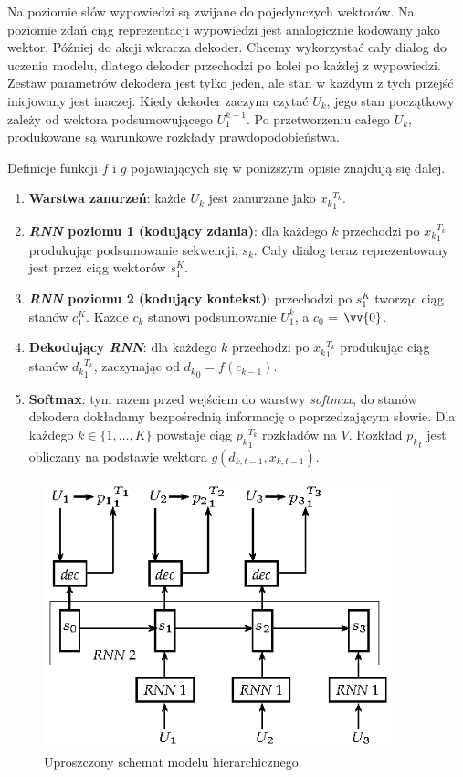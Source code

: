 Na poziomie słów wypowiedzi są zwijane do pojedynczych wektorów. Na poziomie zdań ciąg reprezentacji wypowiedzi jest analogicznie kodowany jako wektor. Później do akcji wkracza dekoder. Chcemy wykorzystać cały dialog do uczenia modelu, dlatego dekoder przechodzi po kolei po każdej z wypowiedzi. Zestaw parametrów dekodera jest tylko jeden, ale stan w każdym z tych przejść inicjowany jest inaczej. Kiedy dekoder zaczyna czytać $U_k$, jego stan początkowy zależy od wektora podsumowującego $U_1^{k-1}$. Po przetworzeniu całego $U_k$, produkowane są warunkowe rozkłady prawdopodobieństwa.

\noindent
Definicje funkcji $f$ i $g$ pojawiających się w poniższym opisie znajdują się dalej.
\begin{enumerate}
    \item \textbf{Warstwa zanurzeń}: każde $U_k$ jest zanurzane jako ${x_k}_1^{T_k}$.
    \item \textbf{\textit{RNN} poziomu 1 (kodujący zdania)}: dla każdego $k$ przechodzi po ${x_k}_1^{T_k}$ produkując podsumowanie sekwencji, $s_k$. Cały dialog teraz reprezentowany jest przez ciąg wektorów $s_1^K$.
    \item \textbf{\textit{RNN} poziomu 2 (kodujący kontekst)}: przechodzi po $s_1^K$ tworząc ciąg stanów $c_1^K$. Każde $c_k$ stanowi podsumowanie $U_1^k$, a $c_0$ = $\vv{0}$.
    \item \textbf{Dekodujący \textit{RNN}}: dla każdego $k$ przechodzi po ${x_k}_1^{T_k}$ produkując ciąg stanów ${d_k}_1^{T_k}$, zaczynając od ${d_k}_0 = f(c_{k-1})$.
    \item \textbf{Softmax}: tym razem przed wejściem do warstwy \textit{softmax}, do stanów dekodera dokładamy bezpośrednią informację o poprzedzającym słowie. Dla każdego $k \in \{1,\dots,K\}$ powstaje ciąg ${p_k}_1^{T_k}$ rozkładów na $V$. Rozkład ${p_k}_t$ jest obliczany na podstawie wektora $g(d_{k,t-1}, x_{k,t-1})$.
\end{enumerate}

\begin{figure}[ht]
  \centering
    \includegraphics[width=0.9\textwidth]{chapter3/img/hred.eps}
  \caption{\small{Uproszczony schemat modelu hierarchicznego.}}
\end{figure}

